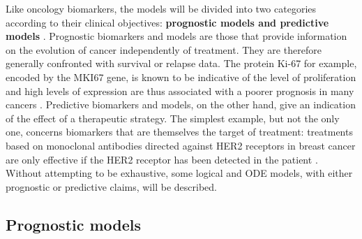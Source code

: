 \documentclass[a4paper,12pt,twoside,onecolumn,openright,final,oldfontcommands]{memoir}
\begin{document}
Like oncology biomarkers, the models will be divided into two categories
according to their clinical objectives: \textbf{prognostic models and
predictive models} \citep{oldenhuis2008prognostic}. Prognostic
biomarkers and models are those that provide information on the
evolution of cancer independently of treatment. They are therefore
generally confronted with survival or relapse data. The protein Ki-67
for example, encoded by the MKI67 gene, is known to be indicative of the
level of proliferation and high levels of expression are thus associated
with a poorer prognosis in many cancers \citep{sawyers2008cancer}.
Predictive biomarkers and models, on the other hand, give an indication
of the effect of a therapeutic strategy. The simplest example, but not
the only one, concerns biomarkers that are themselves the target of
treatment: treatments based on monoclonal antibodies directed against
HER2 receptors in breast cancer are only effective if the HER2 receptor
has been detected in the patient \citep{sawyers2008cancer}. Without
attempting to be exhaustive, some logical and ODE models, with either
prognostic or predictive claims, will be described.

\subsection{Prognostic models}\label{prognostic}
\end{document}

